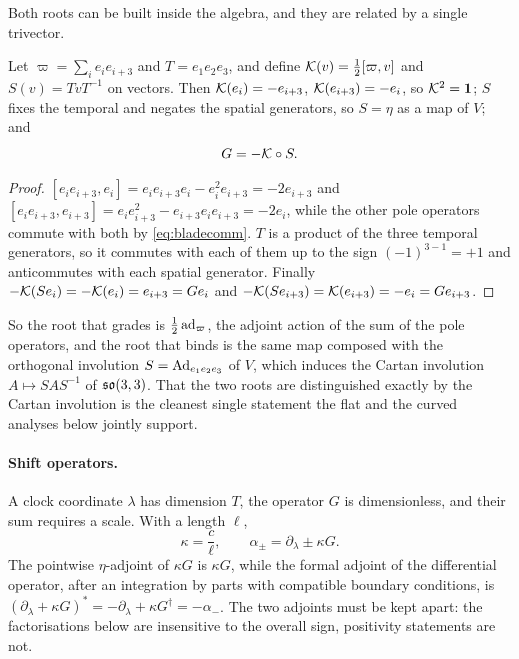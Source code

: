 Both roots can be built inside the algebra, and they are related by a single trivector.

\begin{lemma}
\label{lem:Gclifford}
Let $\varpi=\sum_i e_ie_{i+3}$ and $T=e_1e_2e_3$, and define $\mathcal K(v)=\tfrac12[\varpi,v]$ and $S(v)=TvT^{-1}$ on vectors. Then
$\mathcal K(e_i)=-e_{i+3}$, $\mathcal K(e_{i+3})=-e_i$, so $\mathcal K^2=\mathbf 1$; $S$ fixes the temporal and negates the spatial generators, so $S=\eta$ as a
map of $V$; and
\[
G=-\mathcal K\circ S .
\]
\end{lemma}

\begin{proof}
$[e_ie_{i+3},e_i]=e_ie_{i+3}e_i-e_i^2e_{i+3}=-2e_{i+3}$ and $[e_ie_{i+3},e_{i+3}]=e_ie_{i+3}^2-e_{i+3}e_ie_{i+3}=-2e_i$, while the
other pole operators commute with both by \eqref{eq:bladecomm}. $T$ is a product of the three temporal generators, so it
commutes with each of them up to the sign $(-1)^{3-1}=+1$ and anticommutes with each spatial generator. Finally
$-\mathcal K(S e_i)=-\mathcal K(e_i)=e_{i+3}=Ge_i$ and $-\mathcal K(Se_{i+3})=\mathcal K(e_{i+3})=-e_i=Ge_{i+3}$.
\end{proof}

So the root that grades is $\tfrac12\operatorname{ad}_{\varpi}$, the adjoint action of the sum of the pole operators, and the root that binds
is the same map composed with the orthogonal involution $S=\operatorname{Ad}_{e_1e_2e_3}$ of $V$, which induces the Cartan involution $A\mapsto SAS^{-1}$ of $\mathfrak{so}(3,3)$. That the two roots are distinguished exactly by the
Cartan involution is the cleanest single statement the flat and the curved analyses below jointly support.

\paragraph{Shift operators.} A clock coordinate $\lambda$ has dimension $T$, the operator $G$ is dimensionless, and their sum
requires a scale. With a length $\ell$,
\begin{equation}
\label{eq:kappa}
\kappa=\frac c\ell,\qquad \alpha_\pm=\partial_\lambda\pm\kappa G .
\end{equation}
The pointwise $\eta$-adjoint of $\kappa G$ is $\kappa G$, while the formal adjoint of the differential operator, after an integration by
parts with compatible boundary conditions, is $(\partial_\lambda+\kappa G)^*=-\partial_\lambda+\kappa G^\dagger=-\alpha_-$. The two
adjoints must be kept apart: the factorisations below are insensitive to the overall sign, positivity statements are not.

